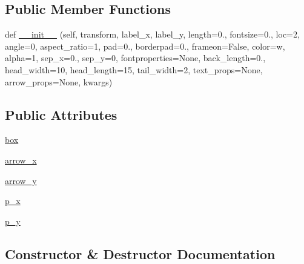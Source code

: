 \subsection*{Public Member Functions}
\begin{DoxyCompactItemize}
\item 
def \hyperlink{classaxes__grid1_1_1anchored__artists_1_1AnchoredDirectionArrows_a5c103fa4ed7a643b86a28108552d55ef}{\+\_\+\+\_\+init\+\_\+\+\_\+} (self, transform, label\+\_\+x, label\+\_\+y, length=0., fontsize=0., loc=2, angle=0, aspect\+\_\+ratio=1, pad=0., borderpad=0., frameon=False, color=\textquotesingle{}w\textquotesingle{}, alpha=1, sep\+\_\+x=0., sep\+\_\+y=0, fontproperties=None, back\+\_\+length=0., head\+\_\+width=10, head\+\_\+length=15, tail\+\_\+width=2, text\+\_\+props=None, arrow\+\_\+props=None, kwargs)
\end{DoxyCompactItemize}
\subsection*{Public Attributes}
\begin{DoxyCompactItemize}
\item 
\hyperlink{classaxes__grid1_1_1anchored__artists_1_1AnchoredDirectionArrows_a874d1006aae5f38e421e273d0e328b4f}{box}
\item 
\hyperlink{classaxes__grid1_1_1anchored__artists_1_1AnchoredDirectionArrows_ae4853f197917523030af5a9c18128e55}{arrow\+\_\+x}
\item 
\hyperlink{classaxes__grid1_1_1anchored__artists_1_1AnchoredDirectionArrows_ad87acb9352786da9699002b81d9bfde9}{arrow\+\_\+y}
\item 
\hyperlink{classaxes__grid1_1_1anchored__artists_1_1AnchoredDirectionArrows_a9cf2aabf828e01a34370aad134d912d6}{p\+\_\+x}
\item 
\hyperlink{classaxes__grid1_1_1anchored__artists_1_1AnchoredDirectionArrows_a3b7e6e78f527fbff7c24a0a306b6c6af}{p\+\_\+y}
\end{DoxyCompactItemize}


\subsection{Constructor \& Destructor Documentation}
\mbox{\label{classaxes__grid1_1_1anchored__artists_1_1AnchoredDirectionArrows_a5c103fa4ed7a643b86a28108552d55ef}} 
